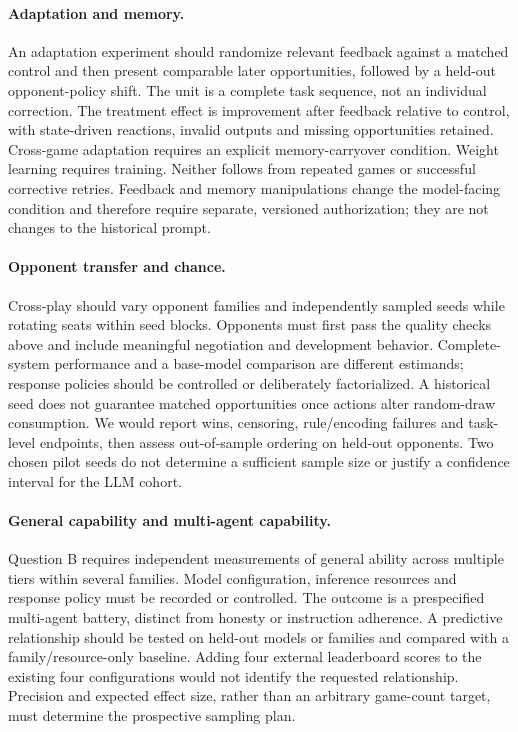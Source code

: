 \paragraph{Adaptation and memory.}
An adaptation experiment should randomize relevant feedback against a matched control and then present comparable later opportunities, followed by a held-out opponent-policy shift. The unit is a complete task sequence, not an individual correction. The treatment effect is improvement after feedback relative to control, with state-driven reactions, invalid outputs and missing opportunities retained. Cross-game adaptation requires an explicit memory-carryover condition. Weight learning requires training. Neither follows from repeated games or successful corrective retries. Feedback and memory manipulations change the model-facing condition and therefore require separate, versioned authorization; they are not changes to the historical prompt.

\paragraph{Opponent transfer and chance.}
Cross-play should vary opponent families and independently sampled seeds while rotating seats within seed blocks. Opponents must first pass the quality checks above and include meaningful negotiation and development behavior. Complete-system performance and a base-model comparison are different estimands; response policies should be controlled or deliberately factorialized. A historical seed does not guarantee matched opportunities once actions alter random-draw consumption. We would report wins, censoring, rule/encoding failures and task-level endpoints, then assess out-of-sample ordering on held-out opponents. Two chosen pilot seeds do not determine a sufficient sample size or justify a confidence interval for the LLM cohort.

\paragraph{General capability and multi-agent capability.}
Question B requires independent measurements of general ability across multiple tiers within several families. Model configuration, inference resources and response policy must be recorded or controlled. The outcome is a prespecified multi-agent battery, distinct from honesty or instruction adherence. A predictive relationship should be tested on held-out models or families and compared with a family/resource-only baseline. Adding four external leaderboard scores to the existing four configurations would not identify the requested relationship. Precision and expected effect size, rather than an arbitrary game-count target, must determine the prospective sampling plan.

